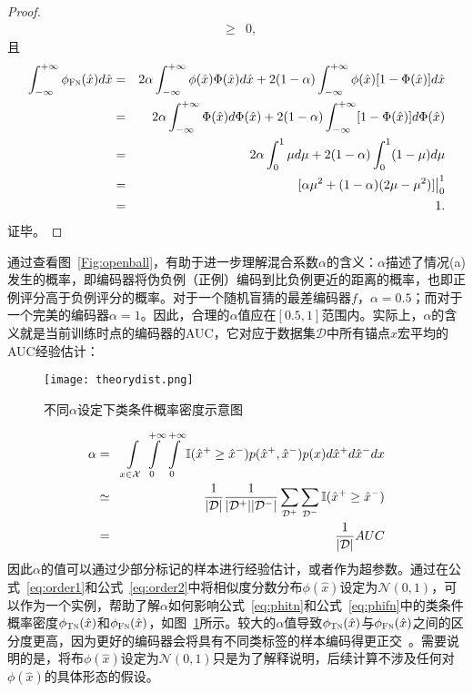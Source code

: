 \begin{lemma}[类条件概率密度]
\begin{proof}
\begin{eqnarray}
		&\geq& 0,
	\end{eqnarray}
且
	\begin{eqnarray}
		\int_{-\infty}^{+\infty}\phi_{\textsc{Fn}}(\hat{x})d\hat x &=& 2\alpha\int_{-\infty}^{+\infty}  \phi(\hat{x}) \Phi(\hat{x})d\hat x +2(1-\alpha)\int_{-\infty}^{+\infty}\phi(\hat{x}) [1-\Phi(\hat{x})] d\hat x \nonumber \\
		&=& 2\alpha\int_{-\infty}^{+\infty} \Phi(\hat{x})d\Phi(\hat{x}) +2(1-\alpha)\int_{-\infty}^{+\infty}[1-\Phi(\hat{x})] d\Phi(\hat{x}) \nonumber \\
		&=& 2\alpha\int_{0}^{1}  \mu d\mu +2(1-\alpha)\int_{0}^{1} (1-\mu) d\mu \nonumber \\
		&=& [\alpha \mu^2 + (1-\alpha) (2\mu - \mu^2) ]\big|_0^1 \nonumber \\
		&=&1.
	\end{eqnarray}
证毕。
\end{proof}
\end{lemma}

通过查看图~\ref{Fig:openball}，有助于进一步理解混合系数$\alpha$的含义：$\alpha$描述了情况(a)发生的概率，即编码器将伪负例（正例）编码到比负例更近的距离的概率，也即正例评分高于负例评分的概率。对于一个随机盲猜的最差编码器$ f $，$\alpha=0.5$；而对于一个完美的编码器$\alpha=1$。因此，合理的$\alpha$值应在$[0.5, 1]$范围内。实际上，$\alpha$的含义就是当前训练时点的编码器的AUC，它对应于数据集$\mathcal{D}$中所有锚点$ x $宏平均的AUC经验估计：
\begin{figure}[!]
	\centering
	\texttt{[image: theorydist.png]}
	\caption{不同$\alpha$设定下类条件概率密度示意图}
	\label{Fig:theorydist}
\end{figure}
\begin{eqnarray}
	\small
	\alpha &=& \int\limits_{x \in \mathcal{X}}  \int\limits_{0}^{+\infty} \int\limits_{0}^{+\infty} \mathbb I (\hat{x}^+ \ge \hat{x}^-)  p(\hat{x}^+ , \hat{x}^-) p(x) d\hat{x}^+  d\hat{x}^- dx\nonumber\\
	&\simeq& \frac{1}{|\mathcal{D}|} \frac{1}{|\mathcal{D}^+| |\mathcal{D}^-|} \sum_{\mathcal{D}^+}\sum_{\mathcal{D}^-}  \mathbb I (\hat{x}^+ \ge \hat{x}^-) \nonumber \\
	&=& \frac{1}{|\mathcal{D}|} AUC
\end{eqnarray}
因此$\alpha$的值可以通过少部分标记的样本进行经验估计，或者作为超参数。通过在公式~\eqref{eq:order1}和公式~\eqref{eq:order2}中将相似度分数分布$\phi(\hat{x})$设定为$\mathcal{N}(0,1)$，可以作为一个实例，帮助了解$\alpha$如何影响公式~\eqref{eq:phitn}和公式~\eqref{eq:phifn}中的类条件概率密度$\phi_{\textsc{Tn}}(\hat{x})$和$\phi_{\textsc{Fn}}(\hat{x})$，如图~\ref{Fig:theorydist}所示。较大的$\alpha$值导致$\phi_{\textsc{Tn}}(\hat{x})$与$\phi_{\textsc{Fn}}(\hat{x})$之间的区分度更高，因为更好的编码器会将具有不同类标签的样本编码得更正交~\cite{Chuang:2020:NIPS}。需要说明的是，将布$\phi(\hat{x})$设定为$\mathcal{N}(0,1)$只是为了解释说明，后续计算不涉及任何对$\phi(\hat{x})$的具体形态的假设。

